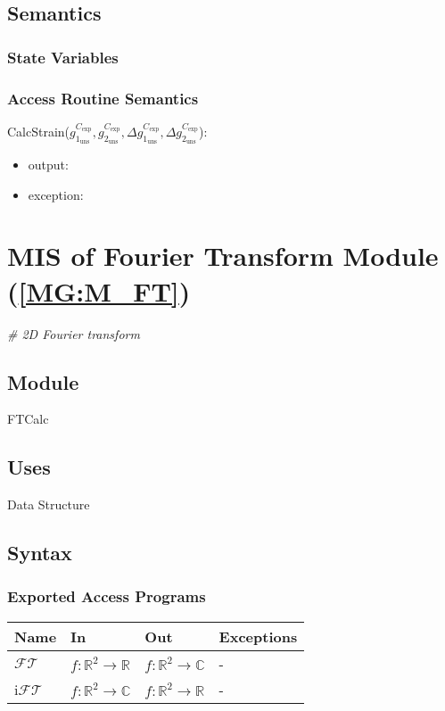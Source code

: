 \documentclass[12pt, titlepage]{article}
\begin{document}
\subsection{Semantics}

\subsubsection{State Variables}


\subsubsection{Access Routine Semantics}

\noindent CalcStrain($g_{1_{{\text{uns}}}}^{C_{\text{exp}}},g_{2_{{\text{uns}}}}^{C_{\text{exp}}},\Delta g_{1_{{\text{uns}}}}^{C_{\text{exp}}},\Delta g_{2_{{\text{uns}}}}^{C_{\text{exp}}}$):
\begin{itemize}
\item output:  
\item exception:  
\end{itemize}

\section{MIS of Fourier Transform Module (\texorpdfstring{\cref{MG:M_FT}}))} \label{MIS_FT}
\textit{{\#} 2D Fourier transform}
\subsection{Module}
FTCalc
\subsection{Uses}
Data Structure
\subsection{Syntax}

\subsubsection{Exported Access Programs}

\begin{center}
\begin{tabular}{p{2cm} p{4cm} p{4cm} p{2cm}}
\hline
\textbf{Name} & \textbf{In} & \textbf{Out} & \textbf{Exceptions} \\
\hline
$\mathcal{FT}$ & $f:\mathbb{R}^2\rightarrow\mathbb{R}$ & $f:\mathbb{R}^2\rightarrow\mathbb{C}$ & - \\
i$\mathcal{FT}$ & $f:\mathbb{R}^2\rightarrow\mathbb{C}$ & $f:\mathbb{R}^2\rightarrow\mathbb{R}$ & - \\
\hline
\end{tabular}
\end{center}
\end{document}
